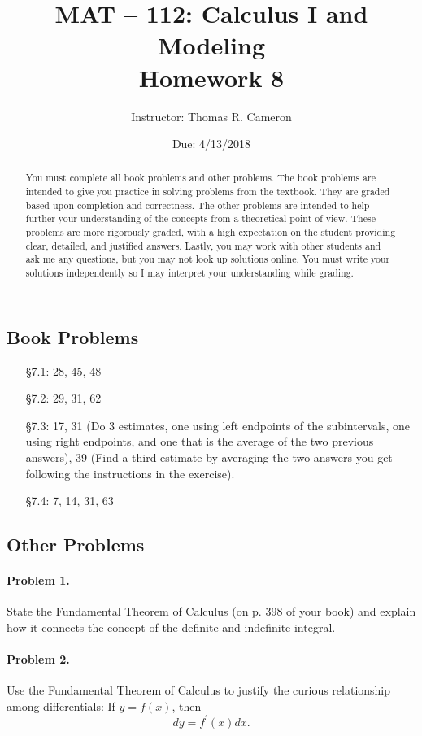 \documentclass{article}
\title{MAT -- 112: Calculus I and Modeling\\
\large{Homework 8}}
\author{Instructor: Thomas R. Cameron}
\date{Due: 4/13/2018}
\begin{document}
\maketitle

\begin{abstract}
You must complete all book problems and other problems. The book problems are intended to give you practice in solving problems from the textbook. They are graded based upon completion and correctness. The other problems are intended to help further your understanding of the concepts from a theoretical point of view. These problems are more rigorously graded, with a high expectation on the student providing clear, detailed, and justified answers. Lastly, you may work with other students and ask me any questions, but you may not look up solutions online. You must write your solutions independently so I may interpret your understanding while grading. 
\end{abstract}

\subsection*{Book Problems}
\begin{itemize}
\item   [\S 7.1:] 28, 45, 48
\item   [\S 7.2:] 29, 31, 62
\item   [\S 7.3:] 17, 31 (Do 3 estimates, one using left endpoints of the subintervals, one using right endpoints, and one that is the average of the two previous answers), 39 (Find a third estimate by averaging the two answers you get following the instructions in the exercise).
\item	  [\S 7.4:] 7, 14, 31, 63
\end{itemize}

\subsection*{Other Problems}

\paragraph*{Problem 1.} State the Fundamental Theorem of Calculus (on p. 398 of your book) and explain how it connects the concept of the definite and indefinite integral. 

\paragraph*{Problem 2.} Use the Fundamental Theorem of Calculus to justify the curious relationship among differentials: If $y=f(x)$, then 
\[
dy=f^{'}(x)dx.
\]
\end{document}
